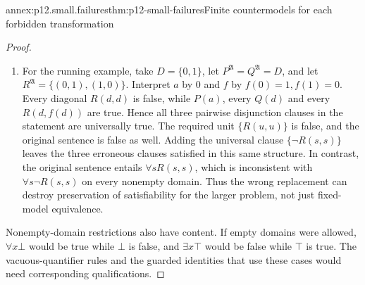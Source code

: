\begin{annexitem}{annex:p12.small.failures}{thm:p12-small-failures}{Finite countermodels for each forbidden transformation}
\begin{proof}
\begin{enumerate}
\item For the running example, take \(D=\{0,1\}\), let
\(P^{\mathfrak A}=Q^{\mathfrak A}=D\), and let
\(R^{\mathfrak A}=\{(0,1),(1,0)\}\). Interpret \(a\) by
\(0\) and \(f\) by \(f(0)=1,f(1)=0\). Every diagonal
\(R(d,d)\) is false, while \(P(a)\), every \(Q(d)\) and
every \(R(d,f(d))\) are true. Hence all three pairwise
disjunction clauses in the statement are universally true.
The required unit \(\{R(u,u)\}\) is false, and the original
sentence is false as well. Adding the universal clause
\(\{\neg R(s,s)\}\) leaves the three erroneous clauses
satisfied in this same structure. In contrast, the original
sentence entails \(\forall sR(s,s)\), which is inconsistent
with \(\forall s\neg R(s,s)\) on every nonempty domain.
Thus the wrong replacement can destroy preservation of
satisfiability for the larger problem, not just fixed-model
equivalence.
\end{enumerate}
Nonempty-domain restrictions also have content. If empty domains
were allowed, \(\forall x\bot\) would be true while \(\bot\)
is false, and \(\exists x\top\) would be false while \(\top\)
is true. The vacuous-quantifier rules and the guarded identities
that use these cases would need corresponding qualifications.
\end{proof}
\end{annexitem}
